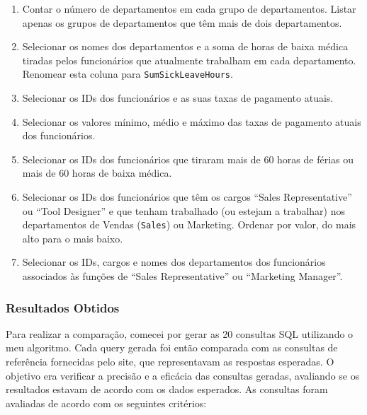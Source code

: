 \documentclass{article}
\begin{document}
\begin{enumerate}
    \item Contar o número de departamentos em cada grupo de departamentos. Listar apenas os grupos de departamentos que têm mais de dois departamentos.
    \item Selecionar os nomes dos departamentos e a soma de horas de baixa médica tiradas pelos funcionários que atualmente trabalham em cada departamento. Renomear esta coluna para \texttt{SumSickLeaveHours}.
    \item Selecionar os IDs dos funcionários e as suas taxas de pagamento atuais.
    \item Selecionar os valores mínimo, médio e máximo das taxas de pagamento atuais dos funcionários.
    \item Selecionar os IDs dos funcionários que tiraram mais de 60 horas de férias ou mais de 60 horas de baixa médica.
    \item Selecionar os IDs dos funcionários que têm os cargos ``Sales Representative'' ou ``Tool Designer'' e que tenham trabalhado (ou estejam a trabalhar) nos departamentos de Vendas (\texttt{Sales}) ou Marketing. Ordenar por valor, do mais alto para o mais baixo.
    \item Selecionar os IDs, cargos e nomes dos departamentos dos funcionários associados às funções de ``Sales Representative'' ou ``Marketing Manager''.
\end{enumerate}

\subsubsection{Resultados Obtidos}

\hspace*{1em} Para realizar a comparação, comecei por gerar as 20 consultas SQL utilizando o meu algoritmo. Cada query gerada foi então comparada com as consultas de referência fornecidas pelo site, que representavam as respostas esperadas. O objetivo era verificar a precisão e a eficácia das consultas geradas, avaliando se os resultados estavam de acordo com os dados esperados. As consultas foram avaliadas de acordo com os seguintes critérios:
\end{document}
